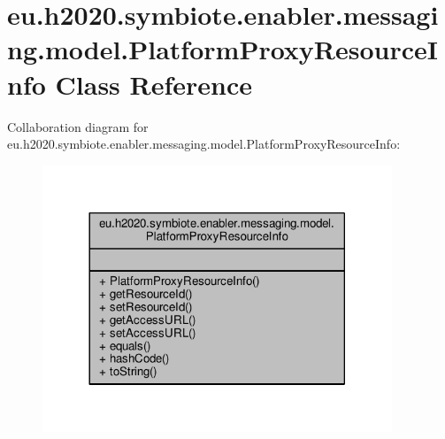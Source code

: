\hypertarget{classeu_1_1h2020_1_1symbiote_1_1enabler_1_1messaging_1_1model_1_1PlatformProxyResourceInfo}{}\section{eu.\+h2020.\+symbiote.\+enabler.\+messaging.\+model.\+Platform\+Proxy\+Resource\+Info Class Reference}
\label{classeu_1_1h2020_1_1symbiote_1_1enabler_1_1messaging_1_1model_1_1PlatformProxyResourceInfo}


Collaboration diagram for eu.\+h2020.\+symbiote.\+enabler.\+messaging.\+model.\+Platform\+Proxy\+Resource\+Info\+:\nopagebreak
\begin{figure}[H]
\begin{center}
\leavevmode
\includegraphics[width=296pt]{classeu_1_1h2020_1_1symbiote_1_1enabler_1_1messaging_1_1model_1_1PlatformProxyResourceInfo__coll__graph}
\end{center}
\end{figure}
